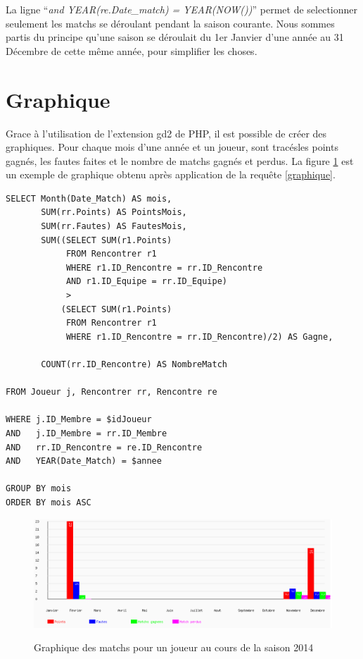 \documentclass[a4paper»,8pt,french,fleqn]{report}
\begin{document}
La ligne ``\textit{and YEAR(re.Date\_match) = YEAR(NOW())}'' permet de selectionner seulement les matchs se déroulant pendant la saison courante. Nous sommes partis du principe qu'une saison se déroulait du 1er Janvier d'une année au 31 Décembre de cette même année, pour simplifier les choses.


\section{Graphique}
Grace à l'utilisation de l'extension gd2 de PHP, il est possible de créer des graphiques. Pour chaque mois d'une année et un joueur, sont tracésles points gagnés, les fautes faites et le nombre de matchs gagnés et perdus. La figure \ref{fig:graph} est un exemple de graphique obtenu après application de la requête \ref{graphique}.

\begin{lstlisting}
SELECT Month(Date_Match) AS mois,
       SUM(rr.Points) AS PointsMois,
       SUM(rr.Fautes) AS FautesMois,
       SUM((SELECT SUM(r1.Points)
            FROM Rencontrer r1
            WHERE r1.ID_Rencontre = rr.ID_Rencontre
            AND r1.ID_Equipe = rr.ID_Equipe)
            >
           (SELECT SUM(r1.Points)
            FROM Rencontrer r1
            WHERE r1.ID_Rencontre = rr.ID_Rencontre)/2) AS Gagne,
    
       COUNT(rr.ID_Rencontre) AS NombreMatch

FROM Joueur j, Rencontrer rr, Rencontre re

WHERE j.ID_Membre = $idJoueur
AND   j.ID_Membre = rr.ID_Membre
AND   rr.ID_Rencontre = re.ID_Rencontre
AND   YEAR(Date_Match) = $annee

GROUP BY mois 
ORDER BY mois ASC
\end{lstlisting}

\begin{figure}[h]
  \centering
    \includegraphics[scale=0.5]{graphe.png}
    \label{fig:graph}
    \caption{Graphique des matchs pour un joueur au cours de la saison 2014}
\end{figure}
\end{document}
